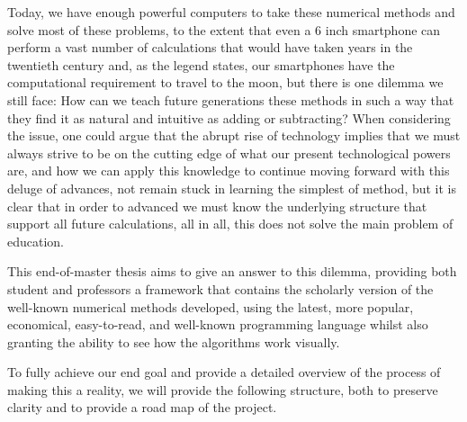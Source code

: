 Today, we have enough powerful computers to take these numerical methods and solve most of these problems, to the extent that even a 6 inch smartphone can perform a vast number of calculations that would have taken years in the twentieth century and, as the legend states, our smartphones have the computational requirement to travel to the moon, but there is one dilemma we still face: How can we teach future generations these methods in such a way that they find it as natural and intuitive as adding or subtracting? When considering the issue, one could argue that the abrupt rise of technology implies that we must always strive to be on the cutting edge of what our present technological powers are, and how we can apply this knowledge to continue moving forward with this deluge of advances, not remain stuck in learning the simplest of method, but it is clear that in order to advanced we must know the underlying structure that support all future calculations, all in all, this does not solve the main problem of education.


This end-of-master thesis aims to give an answer to this dilemma, providing both student and professors a framework that contains the scholarly version of the well-known numerical methods developed, using the latest, more popular, economical, easy-to-read, and well-known programming language whilst also granting the ability to see how the algorithms work visually.  

To fully achieve our end goal and provide a detailed overview of the process of making this a reality, we will provide the following structure, both to preserve clarity and to provide a road map of the project. 

